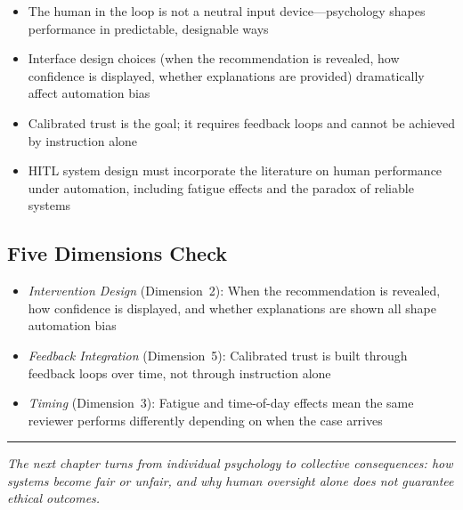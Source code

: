 \begin{itemize}
    \item The human in the loop is not a neutral input device---psychology shapes performance in predictable, designable ways
    \item Interface design choices (when the recommendation is revealed, how confidence is displayed, whether explanations are provided) dramatically affect automation bias
    \item Calibrated trust is the goal; it requires feedback loops and cannot be achieved by instruction alone
    \item HITL system design must incorporate the literature on human performance under automation, including fatigue effects and the paradox of reliable systems
\end{itemize}

\subsection*{Five Dimensions Check}

\begin{itemize}
    \item \textit{Intervention Design} (Dimension~2): When the recommendation is revealed, how confidence is displayed, and whether explanations are shown all shape automation bias
    \item \textit{Feedback Integration} (Dimension~5): Calibrated trust is built through feedback loops over time, not through instruction alone
    \item \textit{Timing} (Dimension~3): Fatigue and time-of-day effects mean the same reviewer performs differently depending on when the case arrives
\end{itemize}

\bigskip
\begin{center}
\rule{0.5\textwidth}{0.4pt}
\end{center}
\bigskip

\noindent\textit{The next chapter turns from individual psychology to collective consequences: how \hitl systems become fair or unfair, and why human oversight alone does not guarantee ethical outcomes.}
